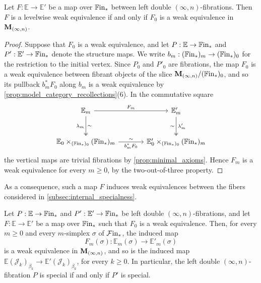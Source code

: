 \documentclass[10pt,reqno]{amsart}
\begin{document}
\begin{lemma}
\label{lem:left_double_degree_zero}
Let $F:\mathbb E\to\mathbb E'$ be a map over $\mathbb{F}\mathrm{in}_*$
between left double $(\infty,n)$-fibrations. Then $F$ is a
levelwise weak equivalence if and only if $F_0$ is a weak
equivalence in $\mathbf M_{(\infty,n)}$.
\end{lemma}
\begin{proof}
Suppose that $F_0$ is a weak equivalence, and let
$P:\mathbb E\to\mathbb{F}\mathrm{in}_*$ and $P':\mathbb E'\to\mathbb{F}\mathrm{in}_*$ denote
the structure maps. We write
$b_m:(\mathbb{F}\mathrm{in}_*)_m\to(\mathbb{F}\mathrm{in}_*)_0$ for the restriction to the
initial vertex. Since $P_0$ and $P'_0$ are fibrations, the map
$F_0$ is a weak equivalence between fibrant objects of the slice
$\mathbf M_{(\infty,n)}/(\mathbb{F}\mathrm{in}_*)_0$, and so its pullback $b_m^*F_0$ along
$b_m$ is a weak equivalence by
\cref{prop:model_category_recollections}(6). In the commutative square
\[
\begin{tikzcd}[ampersand replacement=\&, sep=large]
\mathbb E_m\arrow[r,"F_m"]
  \arrow[d,two heads,"\lambda_m"',"\sim"]
\&\mathbb E'_m\arrow[d,two heads,"\lambda'_m","\sim"']\\
\mathbb E_0\times_{(\bisimFin)_0}(\bisimFin)_m
  \arrow[r,"b_m^*F_0"',"\sim"]
\&\mathbb E'_0\times_{(\bisimFin)_0}(\bisimFin)_m
\end{tikzcd}
\]
the vertical maps are trivial fibrations by
\cref{prop:minimal_axioms}. Hence $F_m$ is a weak equivalence for
every $m\geq0$, by the two-out-of-three property.
\end{proof}

As a consequence, such a map $F$ induces weak equivalences between
the fibers considered in \cref{subsec:internal_specialness}.
\begin{lemma}
\label{lem:general_fiber_comparison}
Let $P:\mathbb E\to\mathbb{F}\mathrm{in}_*$ and
$P':\mathbb E'\to\mathbb{F}\mathrm{in}_*$ be left double
$(\infty,n)$-fibrations, and let
$F:\mathbb E\to\mathbb E'$ be a map over $\mathbb{F}\mathrm{in}_*$ such that
$F_0$ is a weak equivalence. Then, for every $m\geq0$ and every
$m$-simplex $\sigma$ of $\mathcal{F}\mathrm{in}_*$, the induced map
\[
F_m(\sigma):\mathbb E_m(\sigma)\longrightarrow
\mathbb E'_m(\sigma)
\]
is a weak equivalence in $\mathbf M_{(\infty,n)}$, and so is the induced map
$\mathbb E(\mathcal J_k)_{\beta_k}\to
\mathbb E'(\mathcal J_k)_{\beta_k}$, for every $k\geq0$. In
particular, the left double $(\infty,n)$-fibration $P$ is special
if and only if $P'$ is special.
\end{lemma}
\end{document}
